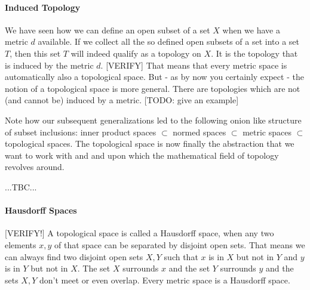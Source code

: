
\paragraph{Induced Topology} 
We have seen how we can define an open subset of a set $X$ when we have a metric $d$ available. If we collect all the so defined open subsets of a set into a set $T$, then this set $T$ will indeed qualify as a topology on $X$. It is the topology that is induced by the metric $d$. [VERIFY] That means that every metric space is automatically also a topological space. But - as by now you certainly expect - the notion of a topological space is more general. There are topologies which are not (and cannot be) induced by a metric. [TODO: give an example]


\medskip
Note how our subsequent generalizations led to the following onion like structure of subset inclusions: inner product spaces $\subset$ normed spaces $\subset$ metric spaces $\subset$ topological spaces. The topological space is now finally the abstraction that we want to work with and and upon which the mathematical field of topology revolves around.



...TBC...







\paragraph{Hausdorff Spaces} [VERIFY!] A topological space is called a Hausdorff space, when any two elements $x,y$ of that space can be separated by disjoint open sets. That means we can always find two disjoint open sets $X,Y$ such that $x$ is in $X$ but not in $Y$ and $y$ is in $Y$ but not in $X$. The set $X$ surrounds $x$ and the set $Y$ surrounds $y$ and the sets $X,Y$ don't meet or even overlap. Every metric space is a Hausdorff space.


